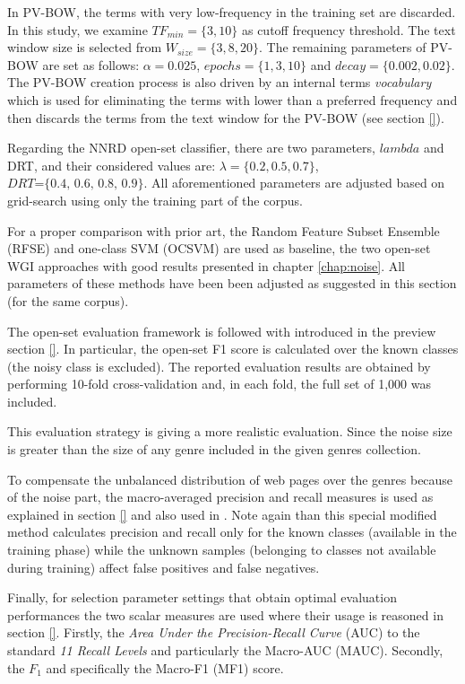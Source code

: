 In PV-BOW, the terms with very low-frequency in the training set are discarded. In this study, we examine $TF_{min}=\{3,10\}$ as cutoff frequency threshold. The text window size is selected from $W_{size}=\{3,8,20\}$. The remaining parameters of PV-BOW are set as follows: $\alpha=0.025$, $epochs=\{1, 3, 10\}$ and $decay=\{0.002, 0.02\}$. The PV-BOW creation process is also driven by an internal terms \textit{vocabulary} which is used for eliminating the terms with lower than a preferred frequency and then discards the terms from the text window for the PV-BOW (see section \ref{}).


Regarding the NNRD open-set classifier, there are two parameters, $lambda$ and DRT, and their considered values are: $\lambda =\{0.2, 0.5, 0.7\}$, $DRT\textit{=\{0.4, 0.6, 0.8, 0.9\}}$. All aforementioned parameters are adjusted based on grid-search using only the training part of the corpus.

For a proper comparison with prior art, the Random Feature Subset Ensemble (RFSE) and one-class SVM (OCSVM) \parencite{pritsos2013open,pritsos2018open} are used as baseline, the two open-set WGI approaches with good results presented in chapter \ref{chap:noise}. All parameters of these methods have been been adjusted as suggested in this section (for the same corpus).

The open-set evaluation framework is followed with  introduced in the preview section \ref{}. In particular, the open-set F1 score \parencite{mendesjunior2016} is calculated over the known classes (the noisy class is excluded). The reported evaluation results are obtained by performing 10-fold cross-validation and, in each fold, the full set of 1,000  was included. 

This evaluation strategy is giving a more realistic evaluation. Since the noise size is greater than the size of any genre included in the given genres collection.

To compensate the unbalanced distribution of web pages over the genres because of the noise part, the macro-averaged precision and recall measures is used as explained in section \ref{} and also used in \parencite{mendesjunior2016}. Note again than this special modified method calculates precision and recall only for the known classes (available in the training phase) while the unknown samples (belonging to classes not available during training) affect false positives and false negatives. 

Finally, for selection parameter settings that obtain optimal evaluation performances the two scalar measures are used where their usage is reasoned in section \ref{}. Firstly, the \textit{Area Under the Precision-Recall Curve} (AUC) to the  standard \textit{11 Recall Levels} and particularly the Macro-AUC (MAUC). Secondly, the $F_{1}$ and specifically the Macro-F1 (MF1) score.



